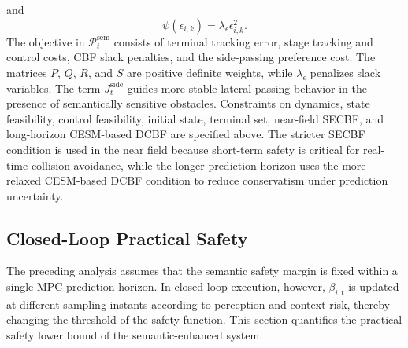 \documentclass[journal]{IEEEtranTIE}
\begin{document}
    and
    \begin{equation}
    \psi(\epsilon_{i,k})=\lambda_\epsilon\epsilon_{i,k}^2.
    \end{equation}
    The objective in $\mathcal{P}_t^{\mathrm{sem}}$ consists of terminal tracking
    error, stage tracking and control costs, CBF slack penalties, and the
    side-passing preference cost. The matrices $P$, $Q$, $R$, and $S$ are
    positive definite weights, while $\lambda_\epsilon$ penalizes slack
    variables. The term $J_t^{\mathrm{side}}$ guides more stable lateral passing
    behavior in the presence of semantically sensitive obstacles. Constraints on
    dynamics, state feasibility, control feasibility, initial state, terminal
    set, near-field SECBF, and long-horizon CESM-based DCBF are specified above.
    The stricter SECBF condition is used in the near field because short-term
    safety is critical for real-time collision avoidance, while the longer
    prediction horizon uses the more relaxed CESM-based DCBF condition to reduce
    conservatism under prediction uncertainty.

    \subsection{Closed-Loop Practical Safety}
    The preceding analysis assumes that the semantic safety margin is fixed
    within a single MPC prediction horizon. In closed-loop execution, however,
    $\beta_{i,t}$ is updated at different sampling instants according to
    perception and context risk, thereby changing the threshold of the safety
    function. This section quantifies the practical safety lower bound of the
    semantic-enhanced system.
\end{document}

